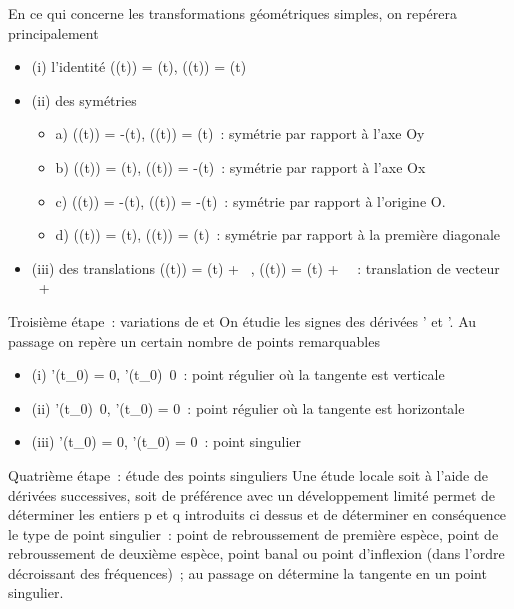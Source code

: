 \documentclass[]{article}
\begin{document}
En ce qui concerne les transformations géométriques simples, on repérera
principalement

\begin{itemize}
\itemsep1pt\parskip0pt
\item
  (i) l'identité \phi(\theta(t)) = \phi(t), \psi(\theta(t)) = \psi(t)
\item
  (ii) des symétries

  \begin{itemize}
  \itemsep1pt\parskip0pt
  \item
    a) \phi(\theta(t)) = -\phi(t), \psi(\theta(t)) = \psi(t)~: symétrie par rapport à l'axe Oy
  \item
    b) \phi(\theta(t)) = \phi(t), \psi(\theta(t)) = -\psi(t)~: symétrie par rapport à l'axe Ox
  \item
    c) \phi(\theta(t)) = -\phi(t), \psi(\theta(t)) = -\psi(t)~: symétrie par rapport à
    l'origine O.
  \item
    d) \phi(\theta(t)) = \psi(t), \psi(\theta(t)) = \phi(t)~: symétrie par rapport à la
    première diagonale
  \end{itemize}
\item
  (iii) des translations \phi(\theta(t)) = \phi(t) + \alpha~, \psi(\theta(t)) = \psi(t) + \beta~~:
  translation de vecteur \alpha~\vec\imath +
  \beta~
\end{itemize}

Troisième étape~: variations de \phi et \psi On étudie les signes des dérivées
\phi' et \psi'. Au passage on repère un certain nombre de points remarquables

\begin{itemize}
\itemsep1pt\parskip0pt
\item
  (i) \phi'(t_0) = 0,
  \psi'(t_0)\neq~0~: point régulier où la
  tangente est verticale
\item
  (ii) \phi'(t_0)\neq~0, \psi'(t_0) =
  0~: point régulier où la tangente est horizontale
\item
  (iii) \phi'(t_0) = 0, \psi'(t_0) = 0~: point singulier
\end{itemize}

Quatrième étape~: étude des points singuliers Une étude locale soit à
l'aide de dérivées successives, soit de préférence avec un développement
limité permet de déterminer les entiers p et q introduits ci dessus et
de déterminer en conséquence le type de point singulier~: point de
rebroussement de première espèce, point de rebroussement de deuxième
espèce, point banal ou point d'inflexion (dans l'ordre décroissant des
fréquences)~; au passage on détermine la tangente en un point singulier.
\end{document}
